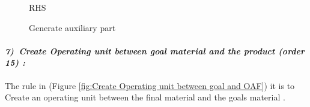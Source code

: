 \begin{figure}[th]
\begin{minipage}{.6\textwidth}
\hspace{2.5cm}  RHS  
\end{minipage}
\caption{\label{fig:Generate auxiliary part} Generate auxiliary part}
 
\end{figure}
\vspace{1cm}




\paragraph{\emph{7)~Create Operating unit between  goal material  and the product (order 15) :} }
 
 
The rule in (Figure \ref{fig:Create Operating unit between  goal and OAF}) 
it is to Create an operating unit  between the final material and the goals material .
  
